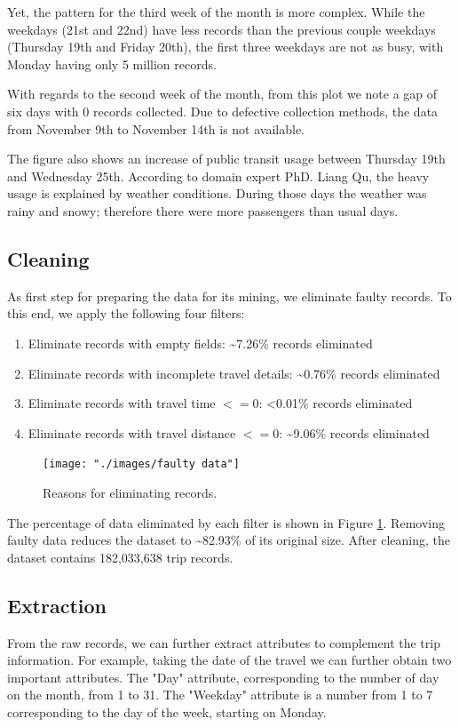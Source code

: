 \documentclass{article}
\begin{document}
Yet, the pattern for the third week of the month is more complex. While the weekdays (21st and 22nd) have less records than the previous couple weekdays (Thursday 19th and Friday 20th), the first three weekdays are not as busy, with Monday having only 5 million records.

With regards to the second week of the month, from this plot we note a gap of six days with 0 records collected. Due to defective collection methods, the data from November 9th to November 14th is not available. 

The figure also shows an increase of public transit usage between Thursday 19th and Wednesday 25th. According to domain expert PhD. Liang Qu, the heavy usage is explained by weather conditions. During those days the weather was rainy and snowy; therefore there were more passengers than usual days.

\subsection{Cleaning}
As first step for preparing the data for its mining, we eliminate faulty records. To this end, we apply the following four filters:

\begin{enumerate}
\item Eliminate records with empty fields: \textasciitilde 7.26\% records eliminated
\item Eliminate records with incomplete travel details: \textasciitilde 0.76\% records eliminated
\item Eliminate records with travel time $<= 0$: <0.01\% records eliminated
\item Eliminate records with travel distance $<= 0$: \textasciitilde 9.06\% records eliminated
\end{enumerate}

\begin{figure}[h]
  \centering
  \texttt{[image: "./images/faulty data"]} %
  \caption{Reasons for eliminating records.}
  \label{fig:preprocessing/faulty}
\end{figure}

The percentage of data eliminated by each filter is shown in Figure \ref{fig:preprocessing/faulty}. Removing faulty data reduces the dataset to \textasciitilde 82.93\% of its original size. After cleaning, the dataset contains 182,033,638 trip records.  

\subsection{Extraction}
From the raw records, we can further extract attributes to complement the trip information. For example, taking the date of the travel we can further obtain two important attributes. The "Day" attribute, corresponding to the number of day on the month, from 1 to 31. The "Weekday" attribute is a number from 1 to 7 corresponding to the day of the week, starting on Monday.
\end{document}
